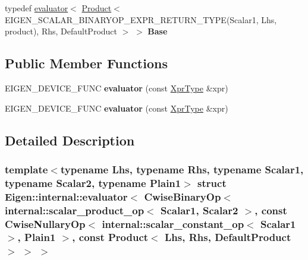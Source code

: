 \begin{DoxyCompactItemize}
\item 
\mbox{\label{struct_eigen_1_1internal_1_1evaluator_3_01_cwise_binary_op_3_01internal_1_1scalar__product__op_321f22566d2663743c7f9d1c3e4e03f69_a9626a0e1d13b8213c27d2a4988280ac3}} 
typedef \hyperlink{struct_eigen_1_1internal_1_1evaluator}{evaluator}$<$ \hyperlink{group___core___module_class_eigen_1_1_product}{Product}$<$ E\+I\+G\+E\+N\+\_\+\+S\+C\+A\+L\+A\+R\+\_\+\+B\+I\+N\+A\+R\+Y\+O\+P\+\_\+\+E\+X\+P\+R\+\_\+\+R\+E\+T\+U\+R\+N\+\_\+\+T\+Y\+PE(Scalar1, Lhs, product), Rhs, Default\+Product $>$ $>$ {\bfseries Base}
\end{DoxyCompactItemize}
\subsection*{Public Member Functions}
\begin{DoxyCompactItemize}
\item 
\mbox{\label{struct_eigen_1_1internal_1_1evaluator_3_01_cwise_binary_op_3_01internal_1_1scalar__product__op_321f22566d2663743c7f9d1c3e4e03f69_a2998439c31f40d62004644b9b2cdc88e}} 
E\+I\+G\+E\+N\+\_\+\+D\+E\+V\+I\+C\+E\+\_\+\+F\+U\+NC {\bfseries evaluator} (const \hyperlink{group___core___module_class_eigen_1_1_cwise_binary_op}{Xpr\+Type} \&xpr)
\item 
\mbox{\label{struct_eigen_1_1internal_1_1evaluator_3_01_cwise_binary_op_3_01internal_1_1scalar__product__op_321f22566d2663743c7f9d1c3e4e03f69_a2998439c31f40d62004644b9b2cdc88e}} 
E\+I\+G\+E\+N\+\_\+\+D\+E\+V\+I\+C\+E\+\_\+\+F\+U\+NC {\bfseries evaluator} (const \hyperlink{group___core___module_class_eigen_1_1_cwise_binary_op}{Xpr\+Type} \&xpr)
\end{DoxyCompactItemize}


\subsection{Detailed Description}
\subsubsection*{template$<$typename Lhs, typename Rhs, typename Scalar1, typename Scalar2, typename Plain1$>$\newline
struct Eigen\+::internal\+::evaluator$<$ Cwise\+Binary\+Op$<$ internal\+::scalar\+\_\+product\+\_\+op$<$ Scalar1, Scalar2 $>$, const Cwise\+Nullary\+Op$<$ internal\+::scalar\+\_\+constant\+\_\+op$<$ Scalar1 $>$, Plain1 $>$, const Product$<$ Lhs, Rhs, Default\+Product $>$ $>$ $>$}



